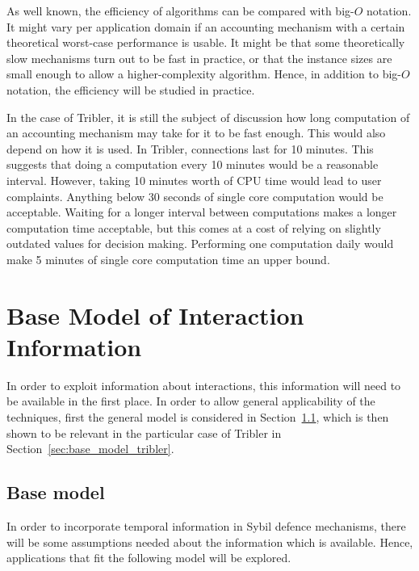 \documentclass[a4paper,11pt]{book}
\theoremstyle{definition}
\begin{document}
As well known, the efficiency of algorithms can be compared with big-$O$ notation.
It might vary per application domain if an accounting mechanism with a certain
theoretical worst-case performance is usable. It might be that some
theoretically slow mechanisms turn out to be fast in practice, or that the
instance sizes are small enough to allow a higher-complexity algorithm. Hence,
in addition to big-$O$ notation, the efficiency will be studied in practice.

In the case of Tribler, it is still the subject of discussion how long computation
of an accounting mechanism may take for it to be fast enough. This would also 
depend on how it is used. In Tribler, connections last for 10 minutes. This suggests
that doing a computation every 10 minutes would be a reasonable interval. However,
taking 10 minutes worth of CPU time would lead to user complaints. Anything below
30 seconds of single core computation would be acceptable. Waiting for a longer
interval between computations makes a longer computation time acceptable, but this
comes at a cost of relying on slightly outdated values for decision making. 
Performing one computation daily would make 5 minutes of single core computation
time an upper bound. 


\chapter{Base Model of Interaction Information}
\label{chap:base_model}

In order to exploit information about interactions, this information will need to be
available in the first place. In order to allow general applicability of the
techniques, first the general model is considered in Section~\ref{sec:base_model}, which is then shown to be
relevant in the particular case of Tribler in Section~\ref{sec:base_model_tribler}.


\section{Base model}
\label{sec:base_model}

In order to incorporate temporal information in Sybil defence mechanisms,
there will be some assumptions needed about the information which is available.
Hence, applications that fit the following model will be explored.
\end{document}
